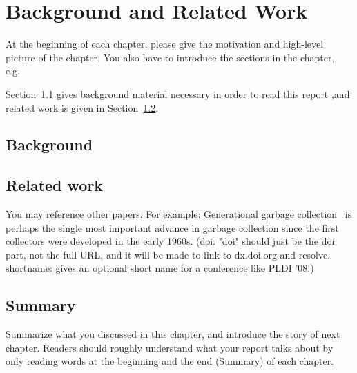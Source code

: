 \chapter{Background and Related Work}
\label{cha:background}

At the beginning of each chapter, please give the motivation and
high-level picture of the chapter. You also have to introduce the sections
in the chapter, e.g.\

  Section~\ref{sec:background} gives background material necessary in
  order to read this report ,and related work is given in
  Section~\ref{sec:relatedwork}.\\

  
\section{Background}
\label{sec:background}


\section{Related work}
\label{sec:relatedwork}

You may reference other papers. For example: Generational garbage
collection~\citep{LH:83,Moon:84,Ungar:84} is perhaps the single most
important advance in garbage collection since the first collectors
were developed in the early 1960s. (doi: "doi" should just be the doi
part, not the full URL, and it will be made to link to dx.doi.org and
resolve.  shortname: gives an optional short name for a conference
like PLDI '08.)


\section{Summary}

Summarize what you discussed in this chapter, and introduce the story
of next chapter. Readers should roughly understand what your report
talks about by only reading words at the beginning and the end
(Summary) of each chapter.


